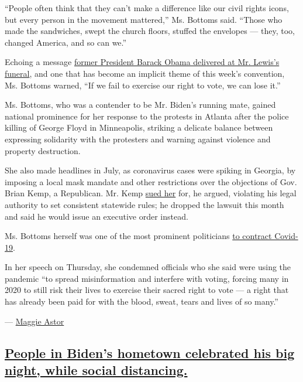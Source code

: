 ``People often think that they can't make a difference like our civil
rights icons, but every person in the movement mattered,'' Ms. Bottoms
said. ``Those who made the sandwiches, swept the church floors, stuffed
the envelopes --- they, too, changed America, and so can we.''

Echoing a message
\href{https://www.nytimes3xbfgragh.onion/2020/07/30/us/politics/john-lewis-funeral-barack-obama.html}{former
President Barack Obama delivered at Mr. Lewis's funeral}, and one that
has become an implicit theme of this week's convention, Ms. Bottoms
warned, ``If we fail to exercise our right to vote, we can lose it.''

Ms. Bottoms, who was a contender to be Mr. Biden's running mate, gained
national prominence for her response to the protests in Atlanta after
the police killing of George Floyd in Minneapolis, striking a delicate
balance between expressing solidarity with the protesters and warning
against violence and property destruction.

She also made headlines in July, as coronavirus cases were spiking in
Georgia, by imposing a local mask mandate and other restrictions over
the objections of Gov. Brian Kemp, a Republican. Mr. Kemp
\href{https://www.nytimes3xbfgragh.onion/2020/07/17/us/brian-kemp-georgia-keisha-lance-bottoms-atlanta.html}{sued
her} for, he argued, violating his legal authority to set consistent
statewide rules; he dropped the lawsuit this month and said he would
issue an executive order instead.

Ms. Bottoms herself was one of the most prominent politicians
\href{https://www.nytimes3xbfgragh.onion/2020/07/06/world/coronavirus-updates.html\#link-7bb0157d}{to
contract Covid-19}.

In her speech on Thursday, she condemned officials who she said were
using the pandemic ``to spread misinformation and interfere with voting,
forcing many in 2020 to still risk their lives to exercise their sacred
right to vote --- a right that has already been paid for with the blood,
sweat, tears and lives of so many.''

--- \href{https://www.nytimes3xbfgragh.onion/by/maggie-astor}{Maggie
Astor}

\hypertarget{people-in-bidens-hometown-celebrated-his-big-night-while-social-distancing}{%
\subsection{\texorpdfstring{\protect\hyperlink{people-in-bidens-hometown-celebrated-his-big-night-while-social-distancing}{People
in Biden's hometown celebrated his big night, while social
distancing.}}{People in Biden's hometown celebrated his big night, while social distancing.}}\label{people-in-bidens-hometown-celebrated-his-big-night-while-social-distancing}}

